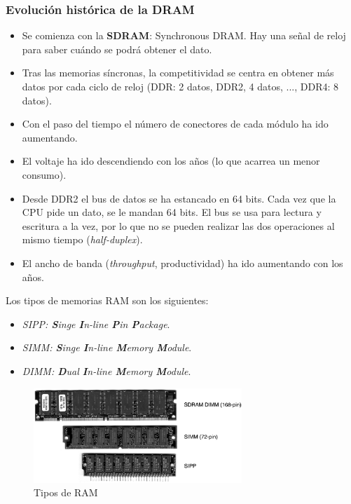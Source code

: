 \documentclass[12pt,spanish]{article}
\begin{document}
\subsubsection{Evolución histórica de la DRAM}
\begin{itemize}
	\item Se comienza con la \textbf{SDRAM}: Synchronous DRAM. Hay una señal de reloj para saber cuándo se podrá obtener el dato.
	\item Tras las memorias síncronas, la competitividad se centra en obtener más datos por cada ciclo de reloj (DDR: 2 datos, DDR2, 4 datos, ..., DDR4: 8 datos).
	\item Con el paso del tiempo el número de conectores de cada módulo ha ido aumentando.
	\item El voltaje ha ido descendiendo con los años (lo que acarrea un menor consumo).
	\item Desde DDR2 el bus de datos se ha estancado en 64 bits. Cada vez que la CPU pide un dato, se le mandan 64 bits. El bus se usa para lectura y escritura a la vez, por lo que no se pueden realizar las dos operaciones al mismo tiempo (\textit{half-duplex}).
	\item El ancho de banda (\textit{throughput}, productividad) ha ido aumentando con los años.
\end{itemize}

Los tipos de memorias RAM son los siguientes:

\begin{itemize}
	\item \textit{SIPP: \textbf{S}inge \textbf{I}n-line \textbf{P}in \textbf{P}ackage}.
	\item \textit{SIMM: \textbf{S}inge \textbf{I}n-line \textbf{M}emory \textbf{M}odule}.
	\item \textit{DIMM: \textbf{D}ual \textbf{I}n-line \textbf{M}emory \textbf{M}odule}.
\end{itemize}

\begin{figure}[H]
	\centering
	\includegraphics[width=0.7\textwidth]{ramtypes.png}
	\caption{Tipos de RAM}
\end{figure}
\end{document}
